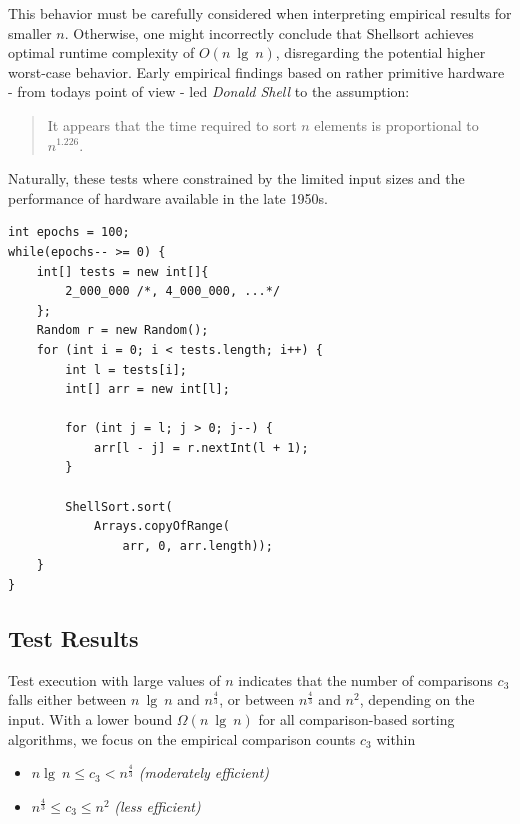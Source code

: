 This behavior must be carefully considered when interpreting empirical results for smaller $n$.
Otherwise, one might incorrectly conclude that Shellsort achieves optimal runtime complexity of $O(n\ \lg\ n)$, disregarding the potential higher worst-case behavior.
Early empirical findings based on rather primitive hardware - from todays point of view - led \textit{Donald Shell} to the assumption:

\blockquote[{\cite[31]{She59}}]{It appears that the time required to sort $n$ elements is proportional to $n^{1.226}$.
}

Naturally, these tests where constrained by the limited input sizes and the performance of hardware available in the late 1950s.



\vspace{4mm}
\begin{lstlisting}[style=javastyle, caption={Code for Shellsort-testing large randomized arrays.}, label=lst:rand]
int epochs = 100;
while(epochs-- >= 0) {
    int[] tests = new int[]{
        2_000_000 /*, 4_000_000, ...*/
    };
    Random r = new Random();
    for (int i = 0; i < tests.length; i++) {
        int l = tests[i];
        int[] arr = new int[l];

        for (int j = l; j > 0; j--) {
            arr[l - j] = r.nextInt(l + 1);
        }

        ShellSort.sort(
            Arrays.copyOfRange(
                arr, 0, arr.length));
    }
}
\end{lstlisting}
\vspace{4mm}


\subsection{Test Results}

Test execution with large values of $n$ indicates that the number of comparisons $c_3$ falls either between $n\ \lg\ n$ and $n^{\frac{4}{3}}$, or between $n^{\frac{4}{3}}$ and $n^2$, depending on the input.
With a lower bound $\Omega(n\ \lg\ n)$ for all comparison-based sorting algorithms, we focus on the empirical comparison counts $c_3$ within

\begin{itemize}
    \item $n \lg\ n \leq c_3 < n^{\frac{4}{3}}$ \textit{(moderately efficient)}
    \item $n^{\frac{4}{3}} \leq c_3 \leq n^2$ \textit{(less efficient)}
\end{itemize}\\
\vspace{2mm}

